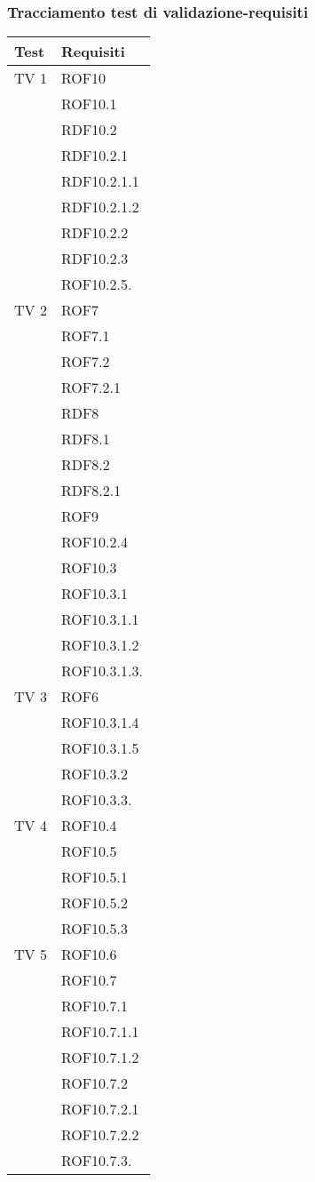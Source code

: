 \subsubsection{Tracciamento test di validazione-requisiti}
\begin{center}
\begin{longtable}{|p{7cm}|p{7cm}|}
\toprule
\textbf{Test} & \textbf{Requisiti}\\
\midrule
TV 1 & ROF10\\ & ROF10.1\\ & RDF10.2\\ & RDF10.2.1\\ &  RDF10.2.1.1\\ &  RDF10.2.1.2\\ &  RDF10.2.2 \\ & RDF10.2.3\\ &   ROF10.2.5.\\
\midrule
TV 2 & ROF7\\ &  ROF7.1\\ &  ROF7.2\\ &  ROF7.2.1\\ &  RDF8\\ &  RDF8.1\\ &  RDF8.2\\ &  RDF8.2.1\\ &  ROF9\\ &  ROF10.2.4\\ &  ROF10.3\\ &  ROF10.3.1\\ &  ROF10.3.1.1\\ &  ROF10.3.1.2\\ &  ROF10.3.1.3.\\
\midrule
TV 3 & ROF6\\ &  ROF10.3.1.4\\ &  ROF10.3.1.5\\ &  ROF10.3.2\\ &  ROF10.3.3.\\
\midrule
TV 4 &  ROF10.4\\ &  ROF10.5\\ &  ROF10.5.1\\ &  ROF10.5.2\\ &  ROF10.5.3\\
\midrule
TV 5 &  ROF10.6\\ &  ROF10.7\\ &  ROF10.7.1\\ &  ROF10.7.1.1\\ &  ROF10.7.1.2\\ &  ROF10.7.2\\ &  ROF10.7.2.1\\ &  ROF10.7.2.2\\ &  ROF10.7.3.\\

\end{longtable}
\end{center}
